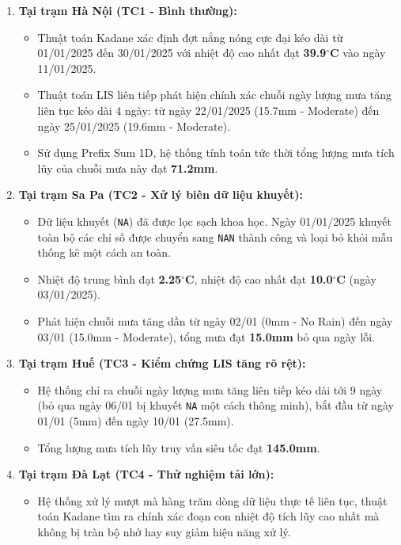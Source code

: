 \begin{enumerate}
    \item \textbf{Tại trạm Hà Nội (TC1 - Bình thường):}
    \begin{itemize}
        \item Thuật toán Kadane xác định đợt nắng nóng cực đại kéo dài từ 01/01/2025 đến 30/01/2025 với nhiệt độ cao nhất đạt \textbf{39.9$^\circ$C} vào ngày 11/01/2025.
        \item Thuật toán LIS liên tiếp phát hiện chính xác chuỗi ngày lượng mưa tăng liên tục kéo dài 4 ngày: từ ngày 22/01/2025 (15.7mm - Moderate) đến ngày 25/01/2025 (19.6mm - Moderate).
        \item Sử dụng Prefix Sum 1D, hệ thống tính toán tức thời tổng lượng mưa tích lũy của chuỗi mưa này đạt \textbf{71.2mm}.
    \end{itemize}

    \item \textbf{Tại trạm Sa Pa (TC2 - Xử lý biên dữ liệu khuyết):}
    \begin{itemize}
        \item Dữ liệu khuyết (\texttt{NA}) đã được lọc sạch khoa học. Ngày 01/01/2025 khuyết toàn bộ các chỉ số được chuyển sang \texttt{NAN} thành công và loại bỏ khỏi mẫu thống kê một cách an toàn.
        \item Nhiệt độ trung bình đạt \textbf{2.25$^\circ$C}, nhiệt độ cao nhất đạt \textbf{10.0$^\circ$C} (ngày 03/01/2025).
        \item Phát hiện chuỗi mưa tăng dần từ ngày 02/01 (0mm - No Rain) đến ngày 03/01 (15.0mm - Moderate), tổng mưa đạt \textbf{15.0mm} bỏ qua ngày lỗi.
    \end{itemize}

    \item \textbf{Tại trạm Huế (TC3 - Kiểm chứng LIS tăng rõ rệt):}
    \begin{itemize}
        \item Hệ thống chỉ ra chuỗi ngày lượng mưa tăng liên tiếp kéo dài tới 9 ngày (bỏ qua ngày 06/01 bị khuyết \texttt{NA} một cách thông minh), bắt đầu từ ngày 01/01 (5mm) đến ngày 10/01 (27.5mm).
        \item Tổng lượng mưa tích lũy truy vấn siêu tốc đạt \textbf{145.0mm}.
    \end{itemize}

    \item \textbf{Tại trạm Đà Lạt (TC4 - Thử nghiệm tải lớn):}
    \begin{itemize}
        \item Hệ thống xử lý mượt mà hàng trăm dòng dữ liệu thực tế liên tục, thuật toán Kadane tìm ra chính xác đoạn con nhiệt độ tích lũy cao nhất mà không bị tràn bộ nhớ hay suy giảm hiệu năng xử lý.
    \end{itemize}
\end{enumerate}

